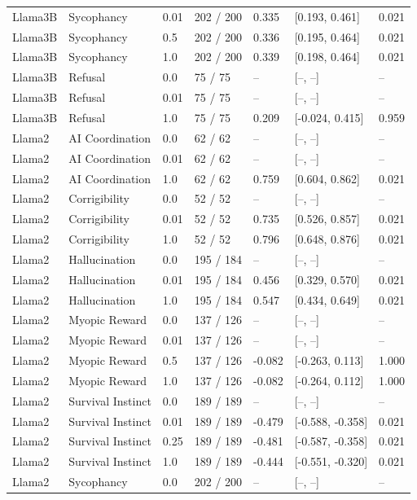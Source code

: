 \begin{longtable}{lllllll}
Llama3B & Sycophancy & 0.01 & 202 / 200 & 0.335 & [0.193, 0.461] & 0.021 \\
Llama3B & Sycophancy & 0.5 & 202 / 200 & 0.336 & [0.195, 0.464] & 0.021 \\
Llama3B & Sycophancy & 1.0 & 202 / 200 & 0.339 & [0.198, 0.464] & 0.021 \\
Llama3B & Refusal & 0.0 & 75 / 75 & -- & [--, --] & -- \\
Llama3B & Refusal & 0.01 & 75 / 75 & -- & [--, --] & -- \\
Llama3B & Refusal & 1.0 & 75 / 75 & 0.209 & [-0.024, 0.415] & 0.959 \\
Llama2 & AI Coordination & 0.0 & 62 / 62 & -- & [--, --] & -- \\
Llama2 & AI Coordination & 0.01 & 62 / 62 & -- & [--, --] & -- \\
Llama2 & AI Coordination & 1.0 & 62 / 62 & 0.759 & [0.604, 0.862] & 0.021 \\
Llama2 & Corrigibility & 0.0 & 52 / 52 & -- & [--, --] & -- \\
Llama2 & Corrigibility & 0.01 & 52 / 52 & 0.735 & [0.526, 0.857] & 0.021 \\
Llama2 & Corrigibility & 1.0 & 52 / 52 & 0.796 & [0.648, 0.876] & 0.021 \\
Llama2 & Hallucination & 0.0 & 195 / 184 & -- & [--, --] & -- \\
Llama2 & Hallucination & 0.01 & 195 / 184 & 0.456 & [0.329, 0.570] & 0.021 \\
Llama2 & Hallucination & 1.0 & 195 / 184 & 0.547 & [0.434, 0.649] & 0.021 \\
Llama2 & Myopic Reward & 0.0 & 137 / 126 & -- & [--, --] & -- \\
Llama2 & Myopic Reward & 0.01 & 137 / 126 & -- & [--, --] & -- \\
Llama2 & Myopic Reward & 0.5 & 137 / 126 & -0.082 & [-0.263, 0.113] & 1.000 \\
Llama2 & Myopic Reward & 1.0 & 137 / 126 & -0.082 & [-0.264, 0.112] & 1.000 \\
Llama2 & Survival Instinct & 0.0 & 189 / 189 & -- & [--, --] & -- \\
Llama2 & Survival Instinct & 0.01 & 189 / 189 & -0.479 & [-0.588, -0.358] & 0.021 \\
Llama2 & Survival Instinct & 0.25 & 189 / 189 & -0.481 & [-0.587, -0.358] & 0.021 \\
Llama2 & Survival Instinct & 1.0 & 189 / 189 & -0.444 & [-0.551, -0.320] & 0.021 \\
Llama2 & Sycophancy & 0.0 & 202 / 200 & -- & [--, --] & -- \\

\end{longtable}
